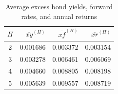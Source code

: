 \begin{table}[htbp]
  \centering
  \caption{Average excess bond yields, forward rates, and annual returns}
  \label{tab:q4a}
  \begin{tabular}{crrr}
    \toprule
    $H$ & $\overline{xy}^{(H)}$ & $\overline{xf}^{(H)}$ & $\overline{xr}^{(H)}$ \\
    \midrule
    2 & 0.001686 & 0.003372 & 0.003154 \\
    3 & 0.003278 & 0.006461 & 0.006069 \\
    4 & 0.004660 & 0.008805 & 0.008198 \\
    5 & 0.005639 & 0.009557 & 0.008719 \\
    \bottomrule
  \end{tabular}
\end{table}
